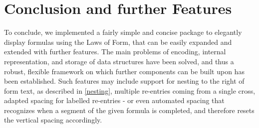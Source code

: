 \documentclass[12pt]{article}
\begin{document}
\section{Conclusion and further Features}\label{conclusion}

To conclude, we implemented a fairly simple and concise package to elegantly display formulas using the Laws of Form\cite{LoF}, that can be easily expanded and extended with further features. The main problems of encoding, internal representation, and storage of data structures have been solved, and thus a robust, flexible framework on which further components can be built upon has been established. Such features may include support for nesting to the right of form text, as described in \ref{nesting}, multiple re-entries coming from a single cross, adapted spacing for labelled re-entries - or even automated spacing that recognizes when a segment of the given formula is completed, and therefore resets the vertical spacing accordingly.

{}


\newpage
\onecolumn
\end{document}
